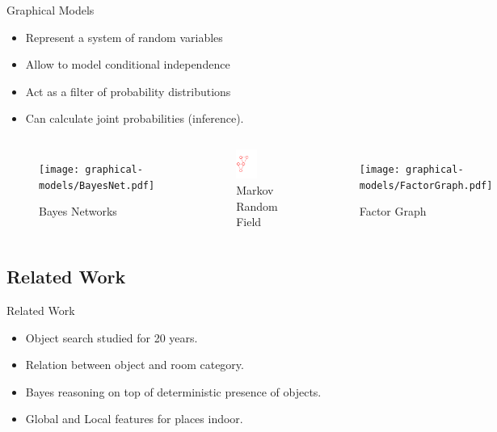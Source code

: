 \documentclass[compress]{beamer}
\begin{document}
\begin{frame}{Graphical Models}
    \begin{itemize}
        \item Represent a system of random variables
        \item Allow to model conditional independence
        \item Act as a filter of probability distributions
        \item Can calculate joint probabilities (inference).
    \end{itemize}
    \begin{columns}[t]
        \begin{figure}
            \texttt{[image: graphical-models/BayesNet.pdf]}
            \caption{Bayes Networks}
        \end{figure}
        \begin{figure}
            \includegraphics[width=0.5\textwidth]{graphical-models/MarkovRandomField}
            \caption{Markov Random Field}
        \end{figure}
        \begin{figure}
            \texttt{[image: graphical-models/FactorGraph.pdf]}
            \caption{Factor Graph}
        \end{figure}
    \end{columns}
\end{frame}

\subsection{Related Work}
\begin{frame}{Related Work}
\begin{itemize}
    \item Object search studied for 20 years\cite{shubina2010}.
    \item Relation between object and room category\cite{galindo2005}.
    \item Bayes reasoning on top of deterministic presence of objects\cite{vasudevan2008}.
    \item Global and Local features for places indoor\cite{quattoni2009recognizing}.
\end{itemize}
\end{frame}
\end{document}
